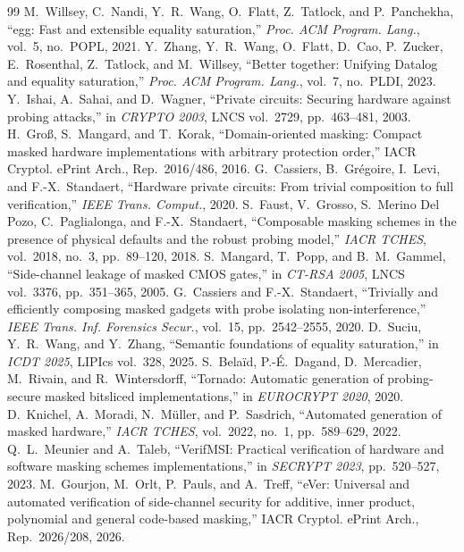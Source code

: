 \documentclass[conference]{IEEEtran}
\begin{document}
\begin{thebibliography}{99}
\footnotesize
{} M.~Willsey, C.~Nandi, Y.~R.~Wang, O.~Flatt, Z.~Tatlock, and P.~Panchekha, ``egg: Fast and extensible equality saturation,'' \emph{Proc. ACM Program. Lang.}, vol.~5, no.~POPL, 2021.
 Y.~Zhang, Y.~R.~Wang, O.~Flatt, D.~Cao, P.~Zucker, E.~Rosenthal, Z.~Tatlock, and M.~Willsey, ``Better together: Unifying Datalog and equality saturation,'' \emph{Proc. ACM Program. Lang.}, vol.~7, no.~PLDI, 2023.
 Y.~Ishai, A.~Sahai, and D.~Wagner, ``Private circuits: Securing hardware against probing attacks,'' in \emph{CRYPTO 2003}, LNCS vol.~2729, pp.~463--481, 2003.
 H.~Gro\ss, S.~Mangard, and T.~Korak, ``Domain-oriented masking: Compact masked hardware implementations with arbitrary protection order,'' IACR Cryptol. ePrint Arch., Rep.~2016/486, 2016.
 G.~Cassiers, B.~Gr\'egoire, I.~Levi, and F.-X.~Standaert, ``Hardware private circuits: From trivial composition to full verification,'' \emph{IEEE Trans. Comput.}, 2020.
 S.~Faust, V.~Grosso, S.~Merino Del Pozo, C.~Paglialonga, and F.-X.~Standaert, ``Composable masking schemes in the presence of physical defaults and the robust probing model,'' \emph{IACR TCHES}, vol.~2018, no.~3, pp.~89--120, 2018.
 S.~Mangard, T.~Popp, and B.~M.~Gammel, ``Side-channel leakage of masked CMOS gates,'' in \emph{CT-RSA 2005}, LNCS vol.~3376, pp.~351--365, 2005.
 G.~Cassiers and F.-X.~Standaert, ``Trivially and efficiently composing masked gadgets with probe isolating non-interference,'' \emph{IEEE Trans. Inf. Forensics Secur.}, vol.~15, pp.~2542--2555, 2020.
 D.~Suciu, Y.~R.~Wang, and Y.~Zhang, ``Semantic foundations of equality saturation,'' in \emph{ICDT 2025}, LIPIcs vol.~328, 2025.
 S.~Bela\"id, P.-\'E.~Dagand, D.~Mercadier, M.~Rivain, and R.~Wintersdorff, ``Tornado: Automatic generation of probing-secure masked bitsliced implementations,'' in \emph{EUROCRYPT 2020}, 2020.
 D.~Knichel, A.~Moradi, N.~M\"uller, and P.~Sasdrich, ``Automated generation of masked hardware,'' \emph{IACR TCHES}, vol.~2022, no.~1, pp.~589--629, 2022.
 Q.~L.~Meunier and A.~Taleb, ``VerifMSI: Practical verification of hardware and software masking schemes implementations,'' in \emph{SECRYPT 2023}, pp.~520--527, 2023.
 M.~Gourjon, M.~Orlt, P.~Pauls, and A.~Treff, ``eVer: Universal and automated verification of side-channel security for additive, inner product, polynomial and general code-based masking,'' IACR Cryptol. ePrint Arch., Rep.~2026/208, 2026.

\end{thebibliography}
\end{document}
